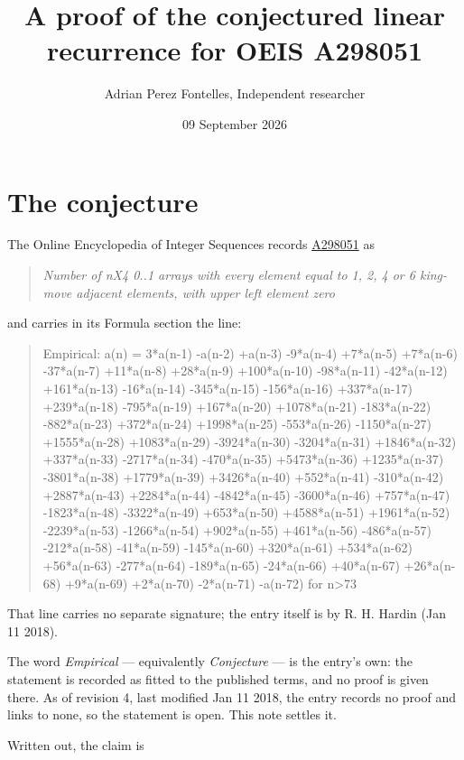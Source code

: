 \documentclass[11pt]{article}
\title{A proof of the conjectured linear recurrence for OEIS A298051}
\author{Adrian Perez Fontelles, Independent researcher}
\date{09 September 2026}
\theoremstyle{definition}
\begin{document}
\maketitle
\section{The conjecture}

The Online Encyclopedia of Integer Sequences records \href{https://oeis.org/A298051}{A298051} as

\begin{quote}\itshape Number of nX4 0..1 arrays with every element equal to 1, 2, 4 or 6 king-move adjacent elements, with upper left element zero\end{quote}

and carries in its Formula section the line:

\begin{quote}\ttfamily Empirical: a(n) = 3*a(n-1) -a(n-2) +a(n-3) -9*a(n-4) +7*a(n-5) +7*a(n-6) -37*a(n-7) +11*a(n-8) +28*a(n-9) +100*a(n-10) -98*a(n-11) -42*a(n-12) +161*a(n-13) -16*a(n-14) -345*a(n-15) -156*a(n-16) +337*a(n-17) +239*a(n-18) -795*a(n-19) +167*a(n-20) +1078*a(n-21) -183*a(n-22) -882*a(n-23) +372*a(n-24) +1998*a(n-25) -553*a(n-26) -1150*a(n-27) +1555*a(n-28) +1083*a(n-29) -3924*a(n-30) -3204*a(n-31) +1846*a(n-32) +337*a(n-33) -2717*a(n-34) -470*a(n-35) +5473*a(n-36) +1235*a(n-37) -3801*a(n-38) +1779*a(n-39) +3426*a(n-40) +552*a(n-41) -310*a(n-42) +2887*a(n-43) +2284*a(n-44) -4842*a(n-45) -3600*a(n-46) +757*a(n-47) -1823*a(n-48) -3322*a(n-49) +653*a(n-50) +4588*a(n-51) +1961*a(n-52) -2239*a(n-53) -1266*a(n-54) +902*a(n-55) +461*a(n-56) -486*a(n-57) -212*a(n-58) -41*a(n-59) -145*a(n-60) +320*a(n-61) +534*a(n-62) +56*a(n-63) -277*a(n-64) -189*a(n-65) -24*a(n-66) +40*a(n-67) +26*a(n-68) +9*a(n-69) +2*a(n-70) -2*a(n-71) -a(n-72) for n>73\end{quote}

That line carries no separate signature; the entry itself is by R. H. Hardin (Jan 11 2018).

The word {\itshape Empirical} --- equivalently {\itshape Conjecture} --- is the entry's own: the statement is recorded as fitted to the published terms, and no proof is given there. As of revision 4, last modified Jan 11 2018, the entry records no proof and links to none, so the statement is open. This note settles it.

Written out, the claim is
\end{document}

